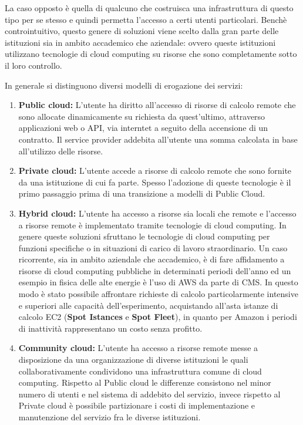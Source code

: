 \documentclass[italian,]{article}
\providecommand{\tightlist}{%
  \setlength{\itemsep}{0pt}\setlength{\parskip}{0pt}}
\begin{document}
La caso opposto è quella di qualcuno che costruisca una infrastruttura
di questo tipo per se stesso e quindi permetta l'accesso a certi utenti
particolari. Benchè controintuitivo, questo genere di soluzioni viene
scelto dalla gran parte delle istituzioni sia in ambito accademico che
aziendale: ovvero queste istituzioni utilizzano tecnologie di cloud
computing su risorse che sono completamente sotto il loro controllo.

In generale si distinguono diversi modelli di erogazione dei servizi:

\begin{enumerate}
\def\labelenumi{\arabic{enumi}.}
\tightlist
\item
  \textbf{Public cloud:} L'utente ha diritto all'accesso di risorse di
  calcolo remote che sono allocate dinamicamente su richiesta da
  quest'ultimo, attraverso applicazioni web o API, via interntet a
  seguito della accensione di un contratto. Il service provider addebita
  all'utente una somma calcolata in base all'utilizzo delle risorse.
\item
  \textbf{Private cloud:} L'utente accede a risorse di calcolo remote
  che sono fornite da una istituzione di cui fa parte. Spesso l'adozione
  di queste tecnologie è il primo passaggio prima di una transizione a
  modelli di Public Cloud. 
\item
  \textbf{Hybrid cloud:} L'utente ha accesso a risorse sia locali che
  remote e l'accesso a risorse remote è implementato tramite tecnologie
  di cloud computing. In genere queste soluzioni sfruttano le tecnologie
  di cloud computing per funzioni specifiche o in situazioni di carico
  di lavoro straordinario. Un caso ricorrente, sia in ambito aziendale
  che accademico, è di fare affidamento a risorse di cloud computing
  pubbliche in determinati periodi dell'anno ed un esempio in fisica
  delle alte energie è l'uso di AWS da parte di CMS. In questo modo è
  stato possibile affrontare richieste di calcolo particolarmente
  intensive e superiori alle capacità dell'esperimento, acquistando
  all'asta istanze di calcolo EC2 (\textbf{Spot Istances} e \textbf{Spot
  Fleet}), in quanto per Amazon i periodi di inattività rappresentano un
  costo senza profitto.
\item
  \textbf{Community cloud:} L'utente ha accesso a risorse remote messe a
  disposizione da una organizzazione di diverse istituzioni le quali
  collaborativamente condividono una infrastruttura comune di cloud
  computing. Rispetto al Public cloud le differenze consistono nel minor
  numero di utenti e nel sistema di addebito del servizio, invece
  rispetto al Private cloud è possibile partizionare i costi di
  implementazione e manutenzione del servizio fra le diverse
  istituzioni.
\end{enumerate}
\end{document}
